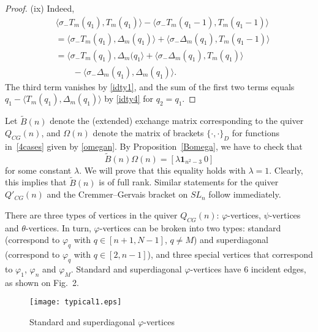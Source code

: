 \documentclass{amsart}
\theoremstyle{definition}
\theoremstyle{remark}
\numberwithin{equation}{section}
\numberwithin{theorem}{section}
\begin{document}
\begin{proof}
 (ix) Indeed,
 \begin{equation*}
 \begin{aligned}
  &\langle\sigma_-T_m(q_1),T_m(q_1)\rangle-\langle\sigma_-T_m(q_1-1),T_m(q_1-1)\rangle\\
  & =\langle\sigma_-T_m(q_1),\Delta_m(q_1)\rangle+\langle\sigma_-\Delta_m(q_1),T_m(q_1-1)\rangle\\
&= \langle\sigma_-T_m(q_1),\Delta_m(q_1\rangle+\langle\sigma_-\Delta_m(q_1),T_m(q_1)\rangle\\ 
&\qquad-\langle\sigma_-\Delta_m(q_1),\Delta_m(q_1)\rangle.
\end{aligned}
\end{equation*} 
The third term vanishes by \eqref{idty1}, and the sum of the first two terms equals $q_1-\langle T_m(q_1), \Delta_m(q_1)\rangle$ by \eqref{idty4} for $q_2=q_1$.
\end{proof}

Let $\widetilde{B}(n)$ denote the (extended) exchange matrix corresponding to the quiver $Q_{CG}(n)$, and $\Omega(n)$ denote the 
matrix of brackets ${{\{\cdot,\cdot\}}}_D$ for functions in~\eqref{4cases} given by \eqref{omegan}. By Proposition~\ref{Bomega}, 
we have to check that 
\begin{equation}\label{criterion}
\widetilde{B}(n)\Omega(n)=[\lambda{\mathbf 1}_{n^2-3}\ 0]
\end{equation}
for some constant $\lambda$. We will prove that this equality holds
with $\lambda=1$. Clearly, this implies that ${{\widetilde{B}}}(n)$ is of full rank. Similar statements for
the quiver $Q'_{CG}(n)$ and the Cremmer--Gervais bracket on $SL_n$ follow immediately.

There are three types of vertices in the quiver $Q_{CG}(n)$: ${{\varphi}}$-vertices, ${{\psi}}$-vertices and 
${{\theta}}$-vertices. In turn, ${{\varphi}}$-vertices can be broken into two types: standard (correspond to 
${{\varphi}}_q$ with $q\in [n+1,N-1]$, $q\ne M$) and superdiagonal (correspond to ${{\varphi}}_q$ with $q\in [2,n-1]$), and 
three special vertices that correspond to ${{\varphi}}_1$, ${{\varphi}}_n$ and ${{\varphi}}_M$. 
Standard and superdiagonal
${{\varphi}}$-vertices have 6 incident edges, as shown on Fig.~2. 

\begin{figure}[ht]
\begin{center}
\texttt{[image: typical1.eps]}
\caption{Standard and superdiagonal ${{\varphi}}$-vertices}
\label{fig:typ1}
\end{center}
\end{figure}
\end{document}
